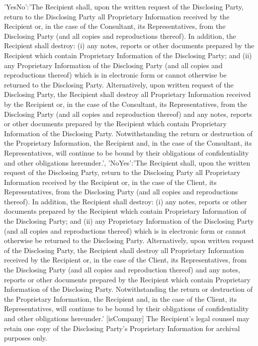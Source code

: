 \documentclass[12pt]{article}
\begin{document}
{{        'YesNo':'The Recipient shall, upon the written request of the Disclosing Party, return to the Disclosing Party all Proprietary Information received by the Recipient or, in the case of the Consultant, its Representatives, from the Disclosing Party (and all copies and reproductions thereof). In addition, the Recipient shall destroy:  (i) any notes, reports or other documents prepared by the Recipient which contain Proprietary Information of the Disclosing Party; and (ii) any Proprietary Information of the Disclosing Party (and all copies and reproductions thereof) which is in electronic form or cannot otherwise be returned to the Disclosing Party. Alternatively, upon written request of the Disclosing Party, the Recipient shall destroy all Proprietary Information received by the Recipient or, in the case of the Consultant, its Representatives, from the Disclosing Party (and all copies and reproduction thereof) and any notes, reports or other documents prepared by the Recipient which contain Proprietary Information of the Disclosing Party. Notwithstanding the return or destruction of the Proprietary Information, the Recipient and, in the case of the Consultant, its Representatives, will continue to be bound by their obligations of confidentiality and other obligations hereunder.',
        'NoYes':'The Recipient shall, upon the written request of the Disclosing Party, return to the Disclosing Party all Proprietary Information received by the Recipient or, in the case of the Client, its Representatives, from the Disclosing Party (and all copies and reproductions thereof). In addition, the Recipient shall destroy:  (i) any notes, reports or other documents prepared by the Recipient which contain Proprietary Information of the Disclosing Party; and (ii) any Proprietary Information of the Disclosing Party (and all copies and reproductions thereof) which is in electronic form or cannot otherwise be returned to the Disclosing Party. Alternatively, upon written request of the Disclosing Party, the Recipient shall destroy all Proprietary Information received by the Recipient or, in the case of the Client, its Representatives, from the Disclosing Party (and all copies and reproduction thereof) and any notes, reports or other documents prepared by the Recipient which contain Proprietary Information of the Disclosing Party. Notwithstanding the return or destruction of the Proprietary Information, the Recipient and, in the case of the Client, its Representatives, will continue to be bound by their obligations of confidentiality and other obligations hereunder.'
    }[isCompany]
}
The Recipient's legal counsel may retain one copy of the Disclosing Party's Proprietary Information for archival purposes only.
\end{document}
